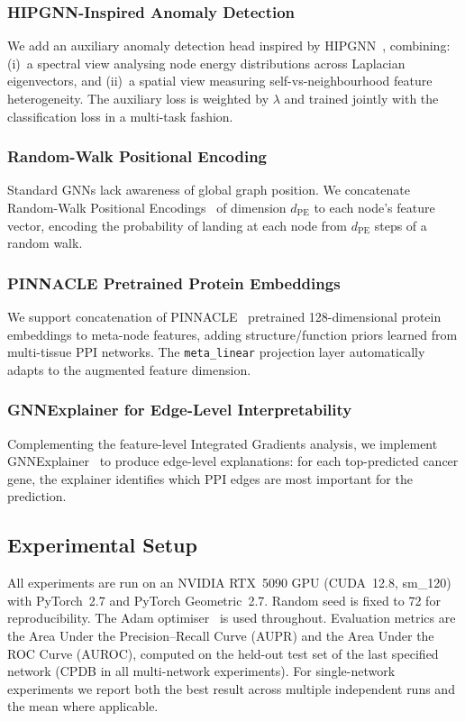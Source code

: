 \subsubsection{HIPGNN-Inspired Anomaly Detection}
We add an auxiliary anomaly detection head inspired by HIPGNN~\cite{hipgnn2025}, combining:
(i)~a spectral view analysing node energy distributions across Laplacian eigenvectors, and
(ii)~a spatial view measuring self-vs-neighbourhood feature heterogeneity. The auxiliary
loss is weighted by $\lambda$ and trained jointly with the classification loss in a
multi-task fashion.

\subsubsection{Random-Walk Positional Encoding}
Standard GNNs lack awareness of global graph position. We concatenate Random-Walk
Positional Encodings~\cite{rwpe2020} of dimension $d_{\text{PE}}$ to each node's
feature vector, encoding the probability of landing at each node from $d_{\text{PE}}$
steps of a random walk.

\subsubsection{PINNACLE Pretrained Protein Embeddings}
We support concatenation of PINNACLE~\cite{pinnacle2024} pretrained 128-dimensional
protein embeddings to meta-node features, adding structure/function priors learned from
multi-tissue PPI networks. The \texttt{meta\_linear} projection layer automatically
adapts to the augmented feature dimension.

\subsubsection{GNNExplainer for Edge-Level Interpretability}
Complementing the feature-level Integrated Gradients analysis, we implement
GNNExplainer~\cite{gnnexplainer2019} to produce edge-level explanations: for each
top-predicted cancer gene, the explainer identifies which PPI edges are most important
for the prediction.

\subsection{Experimental Setup}

All experiments are run on an NVIDIA RTX~5090 GPU (CUDA~12.8, sm\_120) with PyTorch~2.7
and PyTorch Geometric~2.7. Random seed is fixed to 72 for reproducibility. The Adam
optimiser~\cite{kingma2014adam} is used throughout. Evaluation metrics are the Area Under
the Precision--Recall Curve (AUPR) and the Area Under the ROC Curve (AUROC), computed on
the held-out test set of the last specified network (CPDB in all multi-network experiments).
For single-network experiments we report both the best result across multiple independent
runs and the mean where applicable.
